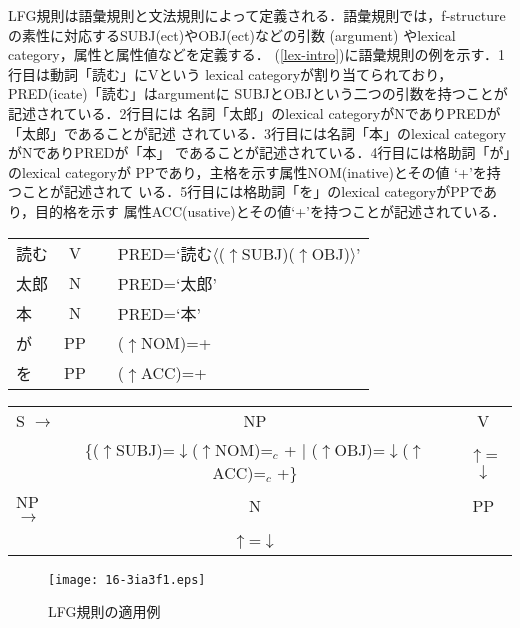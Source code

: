 \documentclass[japanese]{jnlp_1.4}
\begin{document}
LFG規則は語彙規則と文法規則によって定義される．語彙規則では，f-structureの素性に対応するSUBJ(ect)やOBJ(ect)などの引数 (argument) やlexical category，属性と属性値などを定義する．
(\ref{lex-intro})に語彙規則の例を示す．1行目は動詞「読む」にVという
lexical categoryが割り当てられており，PRED(icate)「読む」はargumentに
SUBJとOBJという二つの引数を持つことが記述されている．2行目には
名詞「太郎」のlexical categoryがNでありPREDが「太郎」であることが記述
されている．3行目には名詞「本」のlexical categoryがNでありPREDが「本」
であることが記述されている．4行目には格助詞「が」のlexical categoryが
PPであり，主格を示す属性NOM(inative)とその値 `+'を持つことが記述されて
いる．5行目には格助詞「を」のlexical categoryがPPであり，目的格を示す
属性ACC(usative)とその値`+'を持つことが記述されている．
\begin{example} \label{lex-intro}
\begin{tabular}[t]{lccl}
読む \quad\quad& V & & PRED=`読む$\langle$($\uparrow$SUBJ)($\uparrow$OBJ)$\rangle$'\\ 
太郎 \quad\quad& N & & PRED=`太郎'\\ 
本\quad\quad& N & & PRED=`本'\\ 
が\quad\quad& PP & & ($\uparrow$NOM)=+\\ 
を\quad\quad& PP & & ($\uparrow$ACC)=+\\ 
\end{tabular}
\end{example}
\begin{example}
\label{grammar-intro}
\begin{tabular}[t]{lccc}
S $\longrightarrow$&NP\* &&V\\
&\{($\uparrow$SUBJ)=$\downarrow$\space($\uparrow$NOM)=$_c$ + $|$ ($\uparrow$OBJ)=$\downarrow$\space($\uparrow$ACC)=$_c$ +\}&&$\uparrow$=$\downarrow$ \\[2ex]
NP $\longrightarrow$&N\* &&PP\\
&$\uparrow$=$\downarrow$&&\\[2ex]
\end{tabular}
\end{example}

\begin{figure}[b]
\begin{center}
\texttt{[image: 16-3ia3f1.eps]}
\end{center}
\caption{LFG規則の適用例}
\label{lfg-intro}
\end{figure}
\end{document}
